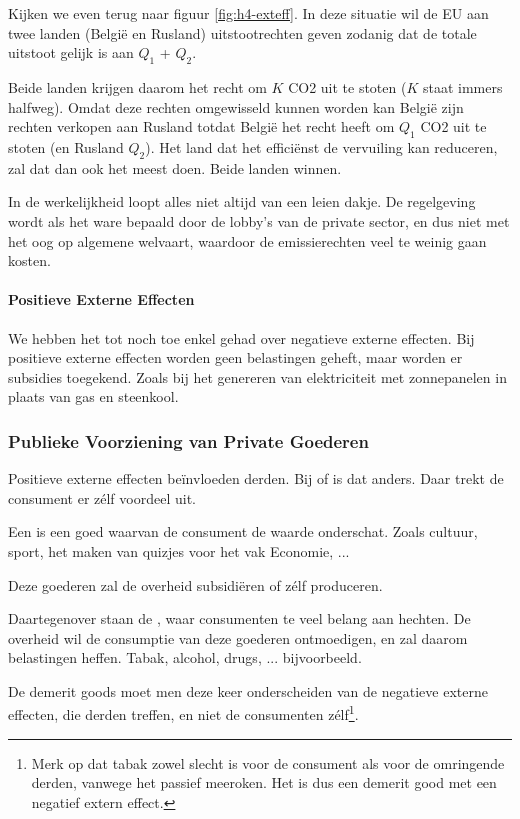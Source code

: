 \par Kijken we even terug naar figuur \ref{fig:h4-exteff}. In deze situatie wil de EU aan twee landen (Belgi\"e en Rusland) uitstootrechten geven zodanig dat de totale uitstoot gelijk is aan $Q_1$ + $Q_2$.
\par Beide landen krijgen daarom het recht om $K$ CO2 uit te stoten ($K$ staat immers halfweg). Omdat deze rechten omgewisseld kunnen worden kan Belgi\"e zijn rechten verkopen aan Rusland totdat Belgi\"e het recht heeft om $Q_1$ CO2 uit te stoten (en Rusland $Q_2$). Het land dat het effici\"enst de vervuiling kan reduceren, zal dat dan ook het meest doen. Beide landen winnen.\\

\par In de werkelijkheid loopt alles niet altijd van een leien dakje. De regelgeving wordt als het ware bepaald door de lobby's van de private sector, en dus niet met het oog op algemene welvaart, waardoor de emissierechten veel te weinig gaan kosten.

\paragraph{Positieve Externe Effecten} We hebben het tot noch toe enkel gehad over negatieve externe effecten. Bij positieve externe effecten worden geen belastingen geheft, maar worden er subsidies toegekend. Zoals bij het genereren van elektriciteit met zonnepanelen in plaats van gas en steenkool.

\subsubsection{Publieke Voorziening van Private Goederen}

Positieve externe effecten be\"invloeden derden. Bij  of  is dat anders. Daar trekt de consument er z\'elf voordeel uit. \par Een  is een goed waarvan de consument de waarde onderschat. Zoals cultuur, sport, het maken van quizjes voor het vak Economie, ...
\par Deze goederen zal de overheid subsidi\"eren of z\'elf produceren.\\

\par Daartegenover staan de , waar consumenten te veel belang aan hechten. De overheid wil de consumptie van deze goederen ontmoedigen, en zal daarom belastingen heffen. Tabak, alcohol, drugs, ... bijvoorbeeld.
\par De demerit goods moet men deze keer onderscheiden van de negatieve externe effecten, die derden treffen, en niet de consumenten z\'elf\footnote{Merk op dat tabak zowel slecht is voor de consument als voor de omringende derden, vanwege het passief meeroken. Het is dus een demerit good met een negatief extern effect.}.

